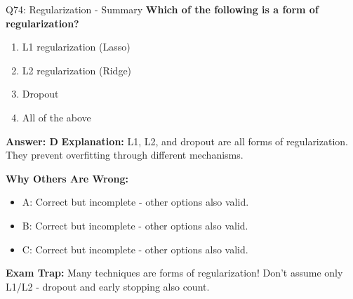 \documentclass[8pt]{beamer}
\begin{document}
	\begin{frame}{Q74: Regularization - Summary}
		\fontsize{6.5}{7.5}\selectfont
		\textbf{Which of the following is a form of regularization?}
		
		\begin{enumerate}
			\item L1 regularization (Lasso)
			\item L2 regularization (Ridge)
			\item Dropout
			\item All of the above
		\end{enumerate}
		
		\vspace{0.05cm}
		\textcolor{myblue}{\textbf{Answer: D}}
		\vspace{0.05cm}
		\textcolor{myblue}{\textbf{Explanation:}} L1, L2, and dropout are all forms of regularization. They prevent overfitting through different mechanisms.
		
		\vspace{0.05cm}
		\textcolor{myred}{\textbf{Why Others Are Wrong:}}
		\begin{itemize}
			\item \textcolor{myred}{A:} Correct but incomplete - other options also valid.
			\item \textcolor{myred}{B:} Correct but incomplete - other options also valid.
			\item \textcolor{myred}{C:} Correct but incomplete - other options also valid.
		\end{itemize}
		
		\textcolor{myred}{\textbf{Exam Trap:}} Many techniques are forms of regularization! Don't assume only L1/L2 - dropout and early stopping also count.
	\end{frame}
	
\end{document}
